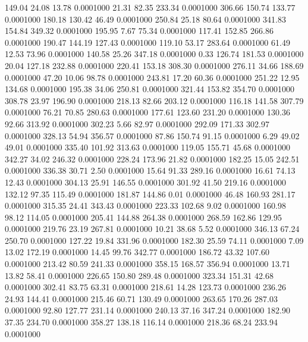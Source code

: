  149.04   24.08   13.78   0.0001000
  21.31   82.35  233.34   0.0001000
 306.66  150.74  133.77   0.0001000
 180.18  130.42   46.49   0.0001000
 250.84   25.18   80.64   0.0001000
 341.83  154.84  349.32   0.0001000
 195.95    7.67   75.34   0.0001000
 117.41  152.85  266.86   0.0001000
 190.47  144.19  127.43   0.0001000
 119.10   53.17  283.64   0.0001000
  61.49   12.53   73.96   0.0001000
 140.58   25.26  347.18   0.0001000
   0.33  126.74  181.53   0.0001000
  20.04  127.18  232.88   0.0001000
 220.41  153.18  308.30   0.0001000
 276.11   34.66  188.69   0.0001000
  47.20   10.06   98.78   0.0001000
 243.81   17.20   60.36   0.0001000
 251.22   12.95  134.68   0.0001000
 195.38   34.06  250.81   0.0001000
 321.44  153.82  354.70   0.0001000
 308.78   23.97  196.90   0.0001000
 218.13   82.66  203.12   0.0001000
 116.18  141.58  307.79   0.0001000
  76.21   70.85  280.63   0.0001000
 177.61  123.60  231.20   0.0001000
 130.36   92.66  313.92   0.0001000
 302.23    5.66   82.97   0.0001000
 292.09  171.33  302.97   0.0001000
 328.13   54.94  356.57   0.0001000
  87.86  150.74   91.15   0.0001000
   6.29   49.02   49.01   0.0001000
 335.40  101.92  313.63   0.0001000
 119.05  155.71   45.68   0.0001000
 342.27   34.02  246.32   0.0001000
 228.24  173.96   21.82   0.0001000
 182.25   15.05  242.51   0.0001000
 336.38   30.71    2.50   0.0001000
  15.64   91.33  289.16   0.0001000
  16.61   74.13   12.43   0.0001000
 304.13   25.91  146.55   0.0001000
 301.92   41.50  219.16   0.0001000
 132.12   97.35  115.49   0.0001000
 181.87  144.86    0.01   0.0001000
  46.48  160.93  281.17   0.0001000
 315.35   24.41  343.43   0.0001000
 223.33  102.68    9.02   0.0001000
 160.98   98.12  114.05   0.0001000
 205.41  144.88  264.38   0.0001000
 268.59  162.86  129.95   0.0001000
 219.76   23.19  267.81   0.0001000
  10.21   38.68    5.52   0.0001000
 346.13   67.24  250.70   0.0001000
 127.22   19.84  331.96   0.0001000
 182.30   25.59   74.11   0.0001000
   7.09   13.02  172.19   0.0001000
  14.45   99.76  342.77   0.0001000
 186.72   43.32  107.60   0.0001000
 213.42   80.59  241.33   0.0001000
 358.15  168.57  356.94   0.0001000
  13.71   13.82   58.41   0.0001000
 226.65  150.80  289.48   0.0001000
 323.34  151.31   42.68   0.0001000
 302.41   83.75   63.31   0.0001000
 218.61   14.28  123.73   0.0001000
 236.26   24.93  144.41   0.0001000
 215.46   60.71  130.49   0.0001000
 263.65  170.26  287.03   0.0001000
  92.80  127.77  231.14   0.0001000
 240.13   37.16  347.24   0.0001000
 182.90   37.35  234.70   0.0001000
 358.27  138.18  116.14   0.0001000
 218.36   68.24  233.94   0.0001000
